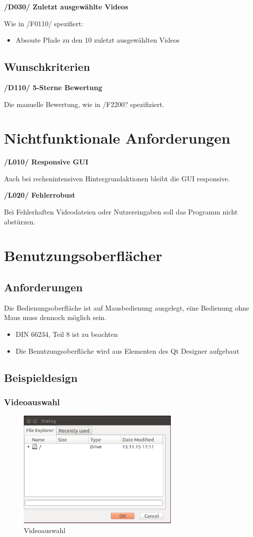 \documentclass[parskip=full]{scrartcl}
\begin{document}
\textbf{/D030/ Zuletzt ausgewählte Videos}

Wie in /F0110/ spezifiert:
\begin{itemize}
\item Absoute Pfade zu den 10 zuletzt ausgewählten Videos
\end{itemize}

\subsection{Wunschkriterien}
\textbf{/D110/ 5-Sterne Bewertung}

Die manuelle Bewertung, wie in /F2200? spezifiziert.


\newpage
\section{Nichtfunktionale Anforderungen}
\textbf{/L010/ Responsive GUI}

Auch bei rechenintensiven Hintergrundaktionen bleibt die GUI responsive.

\textbf{/L020/ Fehlerrobust}

Bei Fehlerhaften Videodateien oder Nutzereingaben soll das Programm nicht abstürzen.
\newpage
\section{Benutzungsoberflächer}
\subsection{Anforderungen}
Die Bedienungsoberfläche ist auf Mausbedienung ausgelegt, eine Bedienung ohne Maus muss dennoch möglich sein.
\begin{itemize}
\item DIN 66234, Teil 8 ist zu beachten
\item Die Benutzungsoberfläche wird aus Elementen des Qt Designer aufgebaut
\end{itemize}
\subsection{Beispieldesign}

\subsubsection{Videoauswahl}
\begin{figure}[htbp] 
\centering
\includegraphics[width=0.7\textwidth]{ToViET/Screenshots/Explorer.png}
\caption{Videoauswahl}
\end{figure}
\newpage
\end{document}
